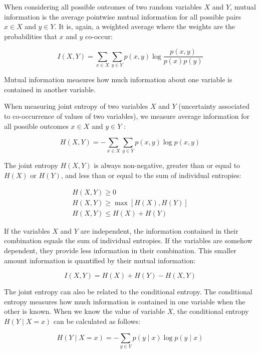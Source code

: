 \documentclass[10pt]{book}
\begin{document}
When considering all possible outcomes of two random variables $X$ and $Y$, mutual information is the average pointwise mutual information for all possible pairs $x \in X$ and $y \in Y$. It is, again, a weighted average where the weights are the probabilities that $x$ and $y$ co-occur:


\begin{equation*}
I(X, Y)=\sum_{x \in X} \sum_{y \in Y} p(x, y) \log \frac{p(x, y)}{p(x) p(y)} \tag{14.8}
\end{equation*}


Mutual information measures how much information about one variable is contained in another variable.

When measuring joint entropy of two variables $X$ and $Y$ (uncertainty associated to co-occurrence of values of two variables), we measure average information for all possible outcomes $x \in X$ and $y \in Y$ :


\begin{equation*}
H(X, Y)=-\sum_{x \in X} \sum_{y \in Y} p(x, y) \log p(x, y) \tag{14.9}
\end{equation*}


The joint entropy $H(X, Y)$ is always non-negative, greater than or equal to $H(X)$ or $H(Y)$, and less than or equal to the sum of individual entropies:


\begin{gather*}
H(X, Y) \geq 0 \\
H(X, Y) \geq \max [H(X), H(Y)]  \tag{14.10}\\
H(X, Y) \leq H(X)+H(Y)
\end{gather*}


If the variables $X$ and $Y$ are independent, the information contained in their combination equals the sum of individual entropies. If the variables are somehow dependent, they provide less information in their combination. This smaller amount information is quantified by their mutual information:


\begin{equation*}
I(X, Y)=H(X)+H(Y)-H(X, Y) \tag{14.11}
\end{equation*}


The joint entropy can also be related to the conditional entropy. The conditional entropy measures how much information is contained in one variable when the other is known. When we know the value of variable $X$, the conditional entropy $H(Y \mid X=x)$ can be calculated as follows:


\begin{equation*}
H(Y \mid X=x)=-\sum_{y \in Y} p(y \mid x) \log p(y \mid x) \tag{14.12}
\end{equation*}
\end{document}
